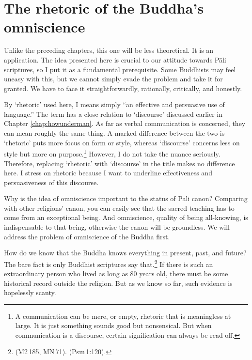 \chapter{The rhetoric of the Buddha's omniscience}\label{chap:rhetoric}

Unlike the preceding chapters, this one will be less theoretical. It is an application. The idea presented here is crucial to our attitude towards P\=ali scriptures, so I put it as a fundamental prerequisite. Some Buddhists may feel uneasy with this, but we cannot simply evade the problem and take it for granted. We have to face it straightforwardly, rationally, critically, and honestly.

By `rhetoric' used here, I means simply ``an effective and persuasive use of language.'' The term has a close relation to `discourse' discussed earlier in Chapter \ref{chap:howunderman}. As far as verbal communication is concerned, they can mean roughly the same thing. A marked difference between the two is `rhetoric' puts more focus on form or style, whereas `discourse' concerns less on style but more on purpose.\footnote{A communication can be mere, or empty, rhetoric that is meaningless at large. It is just something sounds good but nonsensical. But when communication is a discourse, certain signification can always be read off.} However, I do not take the nuance seriously. Therefore, replacing `rhetoric' with `discourse' in the title makes no difference here. I stress on rhetoric because I want to underline effectiveness and persuasiveness of this discourse.

Why is the idea of omniscience important to the status of P\=ali canon? Comparing with other religions' canon, you can easily see that the sacred teaching has to come from an exceptional being. And omniscience, quality of being all-knowing, is indispensable to that being, otherwise the canon will be groundless. We will address the problem of omniscience of the Buddha first.

How do we know that the Buddha knows everything in present, past, and future? The bare fact is only Buddhist scriptures say that.\footnote{ (M2\,185, MN\,71).  (Psm\,1:120).} If there is such an extraordinary person who lived as long as 80 years old, there must be some historical record outside the religion. But as we know so far, such evidence is hopelessly scanty.

